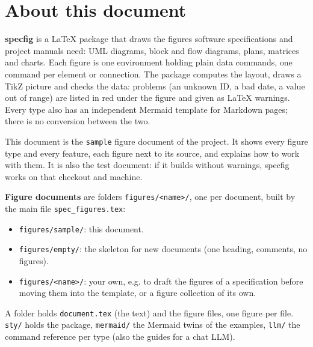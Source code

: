 \raggedright %

\tableofcontents

\section{About this document}

\textbf{specfig} is a LaTeX package that draws the figures software specifications and project manuals need: UML diagrams, block and flow diagrams, plans, matrices and charts. Each figure is one environment holding plain data commands, one command per element or connection. The package computes the layout, draws a TikZ picture and checks the data: problems (an unknown ID, a bad date, a value out of range) are listed in red under the figure and given as LaTeX warnings. Every type also has an independent Mermaid template for Markdown pages; there is no conversion between the two.

This document is the \texttt{sample} figure document of the project. It shows every figure type and every feature, each figure next to its source, and explains how to work with them. It is also the test document: if it builds without warnings, specfig works on that checkout and machine.

\textbf{Figure documents} are folders \texttt{figures/<name>/}, one per document, built by the main file \texttt{spec_figures.tex}:

\begin{itemize}
  \item \texttt{figures/sample/}: this document.
  \item \texttt{figures/empty/}: the skeleton for new documents (one heading, comments, no figures).
  \item \texttt{figures/<name>/}: your own, e.g. to draft the figures of a specification before moving them into the template, or a figure collection of its own.
\end{itemize}

A folder holds \texttt{document.tex} (the text) and the figure files, one figure per file. \texttt{sty/} holds the package, \texttt{mermaid/} the Mermaid twins of the examples, \texttt{llm/} the command reference per type (also the guides for a chat LLM).

